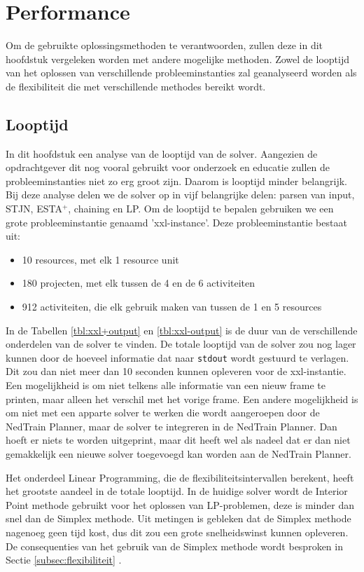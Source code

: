 \section{Performance}
Om de gebruikte oplossingsmethoden te verantwoorden, zullen deze in dit hoofdstuk vergeleken worden met andere mogelijke methoden. Zowel de looptijd van het oplossen van verschillende probleeminstanties zal geanalyseerd worden als de flexibiliteit die met verschillende methodes bereikt wordt.

\subsection{Looptijd}
In dit hoofdstuk een analyse van de looptijd van de solver. Aangezien de opdrachtgever dit nog vooral gebruikt voor onderzoek en educatie zullen de probleeminstanties niet zo erg groot zijn. Daarom is looptijd minder belangrijk. Bij deze analyse delen we de solver op in vijf belangrijke delen: parsen van input, STJN, ESTA$^+$, chaining en LP. Om de looptijd te bepalen gebruiken we een grote probleeminstantie genaamd 'xxl-instance'. Deze probleeminstantie bestaat uit:
\begin{itemize}
    \item 10 resources, met elk 1 resource unit
    \item 180 projecten, met elk tussen de 4 en de 6 activiteiten
    \item 912 activiteiten, die elk gebruik maken van tussen de 1 en 5 resources
\end{itemize}

In de Tabellen \ref{tbl:xxl+output} en \ref{tbl:xxl-output} is de duur van de verschillende onderdelen van de solver te vinden. De totale looptijd van de solver zou nog lager kunnen door de hoeveel informatie dat naar \texttt{stdout} wordt gestuurd te verlagen. Dit zou dan niet meer dan 10 seconden kunnen opleveren voor de xxl-instantie. Een mogelijkheid is om niet telkens alle informatie van een nieuw frame te printen, maar alleen het verschil met het vorige frame. Een andere mogelijkheid is om niet met een apparte solver te werken die wordt aangeroepen door de NedTrain Planner, maar de solver te integreren in de NedTrain Planner. Dan hoeft er niets te worden uitgeprint, maar dit heeft wel als nadeel dat er dan niet gemakkelijk een nieuwe solver toegevoegd kan worden aan de NedTrain Planner.

Het onderdeel Linear Programming, die de flexibiliteitsintervallen berekent, heeft het grootste aandeel in de totale looptijd. In de huidige solver wordt de Interior Point methode gebruikt voor het oplossen van LP-problemen, deze is minder dan snel dan de Simplex methode. Uit metingen is gebleken dat de Simplex methode nagenoeg geen tijd kost, dus dit zou een grote snelheidswinst kunnen opleveren. De consequenties van het gebruik van de Simplex methode wordt besproken in Sectie \ref{subsec:flexibiliteit} .

